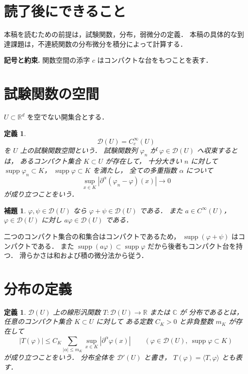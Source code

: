 \documentclass[a5paper,10pt,onecolumn]{jsarticle}
\makeatletter
\theoremstyle{mathnotetheorem}
\newtheorem{definition}[theorem]{定義}
\newtheorem{lemma}[theorem]{補題}
\renewcommand{\proofname}{証明}
\renewenvironment{proof}[1][\proofname]{%
  \par\pushQED{\qed}\normalfont\topsep4\p@\@plus2\p@\relax
  \trivlist\item[\hskip\labelsep\bfseries #1]\ignorespaces
}{\popQED\endtrivlist\@endpefalse}
\makeatother
\begin{document}
\section*{読了後にできること}
本稿を読むための前提は，試験関数，分布，弱微分の定義．
本稿の具体的な到達課題は，不連続関数の分布微分を積分によって計算する．


\par\noindent\textbf{記号と約束.}\quad
関数空間の添字 $c$ はコンパクトな台をもつことを表す．
\par

\section{試験関数の空間}

$U\subset\mathbb R^d$ を空でない開集合とする．

\begin{definition}
\[
 \mathcal D(U)=C_c^\infty(U)
\]
を $U$ 上の\emph{試験関数空間}という．
試験関数列 $\varphi_n$ が
$\varphi\in\mathcal D(U)$ へ収束するとは，
あるコンパクト集合 $K\subset U$ が存在して，
十分大きい $n$ に対して
$\operatorname{supp}\varphi_n\subset K$，
$\operatorname{supp}\varphi\subset K$ を満たし，
全ての多重指数 $\alpha$ について
\[
 \sup_{x\in K}|\partial^\alpha(\varphi_n-\varphi)(x)|
 \longrightarrow0
\]
が成り立つことをいう．
\end{definition}

\begin{lemma}\label{lem:test-mult}
$\varphi,\psi\in\mathcal D(U)$ なら
$\varphi+\psi\in\mathcal D(U)$ である．
また $a\in C^\infty(U)$，
$\varphi\in\mathcal D(U)$ に対し
$a\varphi\in\mathcal D(U)$ である．
\end{lemma}
\begin{proof}
二つのコンパクト集合の和集合はコンパクトであるため，
$\operatorname{supp}(\varphi+\psi)$ はコンパクトである．
また $\operatorname{supp}(a\varphi)\subset
\operatorname{supp}\varphi$ だから後者もコンパクト台を持つ．
滑らかさは和および積の微分法から従う．
\end{proof}

\section{分布の定義}

\begin{definition}
$\mathcal D(U)$ 上の線形汎関数
$T:\mathcal D(U)\to\mathbb R$ または $\mathbb C$ が
\emph{分布}であるとは，
任意のコンパクト集合 $K\subset U$ に対して
ある定数 $C_K>0$ と非負整数 $m_K$ が存在して
\[
 |T(\varphi)|\le C_K
 \sum_{|\alpha|\le m_K}
 \sup_{x\in K}|\partial^\alpha\varphi(x)|
 \qquad(\varphi\in\mathcal D(U),\
   \operatorname{supp}\varphi\subset K)
\]
が成り立つことをいう．
分布全体を $\mathcal D'(U)$ と書き，
$T(\varphi)=\langle T,\varphi\rangle$ とも表す．
\end{definition}
\end{document}
